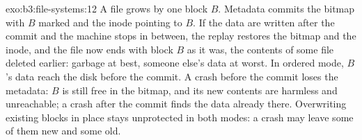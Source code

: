\begin{solution}{exo:b3:file-systems:12}
A file grows by one block $B$. Metadata  commits the bitmap with $B$ marked and the inode pointing to $B$. If the data are written after the commit and the machine stops in between, the replay restores the bitmap and the inode, and the file now ends with block $B$ as it was, the contents of some file deleted earlier: garbage at best, someone else's data at worst. In ordered mode, $B$'s data reach the disk before the commit. A crash before the commit loses the metadata: $B$ is still free in the bitmap, and its new contents are harmless and unreachable; a crash after the commit finds the data already there. Overwriting existing blocks in place stays unprotected in both modes: a crash may leave some of them new and some old.
\end{solution}

